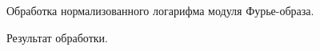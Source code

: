 \documentclass[a5paper, 10pt]{article}
\theoremstyle{definition}
\theoremstyle{plain}
\theoremstyle{remark}
\begin{document}
\begin{figure}[h!]
\caption{Обработка нормализованного логарифма модуля Фурье-образа. }
\end{figure}

\begin{figure}[h!]
\caption{Результат обработки. }
\end{figure}
\end{document}

